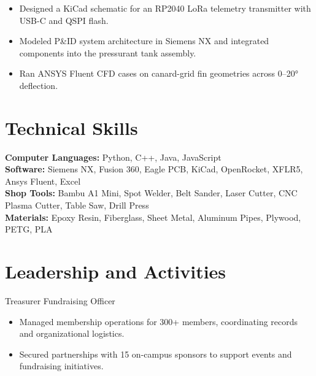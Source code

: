 \begin{itemize}
  \item Designed a KiCad schematic for an RP2040 LoRa telemetry transmitter with USB-C and QSPI flash.
  \item Modeled P\&ID system architecture in Siemens NX and integrated components into the pressurant tank assembly.
  \item Ran ANSYS Fluent CFD cases on canard-grid fin geometries across 0--20° deflection.
\end{itemize}

\section{Technical Skills}
\textbf{Computer Languages:} Python, C++, Java, JavaScript\\
\textbf{Software:} Siemens NX, Fusion 360, Eagle PCB, KiCad, OpenRocket, XFLR5, Ansys Fluent, Excel\\
\textbf{Shop Tools:} Bambu A1 Mini, Spot Welder, Belt Sander, Laser Cutter, CNC Plasma Cutter, Table Saw, Drill Press\\
\textbf{Materials:} Epoxy Resin, Fiberglass, Sheet Metal, Aluminum Pipes, Plywood, PETG, PLA

\section{Leadership and Activities}

Treasurer \textbar{} Fundraising Officer
\begin{itemize}
  \item Managed membership operations for 300+ members, coordinating records and organizational logistics.
  \item Secured partnerships with 15 on-campus sponsors to support events and fundraising initiatives.
\end{itemize}
\entrygap

